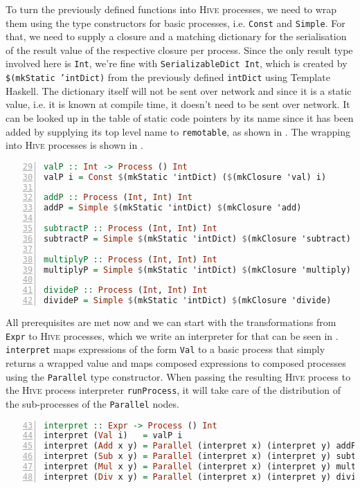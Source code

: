 To turn the previously defined functions into \textsc{Hive} processes, we need to wrap them using the type constructors for basic processes, i.e. \texttt{Const} and \texttt{Simple}. For that, we need to supply a closure and a matching dictionary for the serialisation of the result value of the respective closure per process. Since the only result type involved here is \texttt{Int}, we're fine with \texttt{SerializableDict Int}, which is created by \texttt{\$(mkStatic 'intDict)} from the previously defined \texttt{intDict} using \textsf{Template Haskell}. The dictionary itself will not be sent over network and since it is a static value, i.e. it is known at compile time, it doesn't need to be sent over network. It can be looked up in the table of static code pointers by its name since it has been added by supplying its top level name to \texttt{remotable}, as shown in . The wrapping into \textsc{Hive} processes is shown in .
\begin{lstlisting}[language=Haskell, caption=Creating function closures and wrapping them into \textsc{Hive} processes., label=lst:arith_wrapping, numbers=left, frame=bt, firstnumber=29]
valP :: Int -> Process () Int
valP i = Const $(mkStatic 'intDict) ($(mkClosure 'val) i)

addP :: Process (Int, Int) Int
addP = Simple $(mkStatic 'intDict) $(mkClosure 'add)

subtractP :: Process (Int, Int) Int
subtractP = Simple $(mkStatic 'intDict) $(mkClosure 'subtract)

multiplyP :: Process (Int, Int) Int
multiplyP = Simple $(mkStatic 'intDict) $(mkClosure 'multiply)

divideP :: Process (Int, Int) Int
divideP = Simple $(mkStatic 'intDict) $(mkClosure 'divide)
\end{lstlisting}

All prerequisites are met now and we can start with the transformations from \texttt{Expr} to \textsc{Hive} processes, which we write an interpreter for that can be seen in . \texttt{interpret} maps expressions of the form \texttt{Val} to a basic process that simply returns a wrapped value and maps composed expressions to composed processes using the \texttt{Parallel} type constructor. When passing the resulting \textsc{Hive} process to the \textsc{Hive} process interpreter \texttt{runProcess}, it will take care of the distribution of the sub-processes of the \texttt{Parallel} nodes.
\begin{lstlisting}[language=Haskell, caption=Transformation from \texttt{Expr} to \textsc{Hive} processes., label=lst:arith_transformation, numbers=left, frame=bt, firstnumber=43]
interpret :: Expr -> Process () Int
interpret (Val i)   = valP i
interpret (Add x y) = Parallel (interpret x) (interpret y) addP
interpret (Sub x y) = Parallel (interpret x) (interpret y) subtractP
interpret (Mul x y) = Parallel (interpret x) (interpret y) multiplyP
interpret (Div x y) = Parallel (interpret x) (interpret y) divideP
\end{lstlisting}

